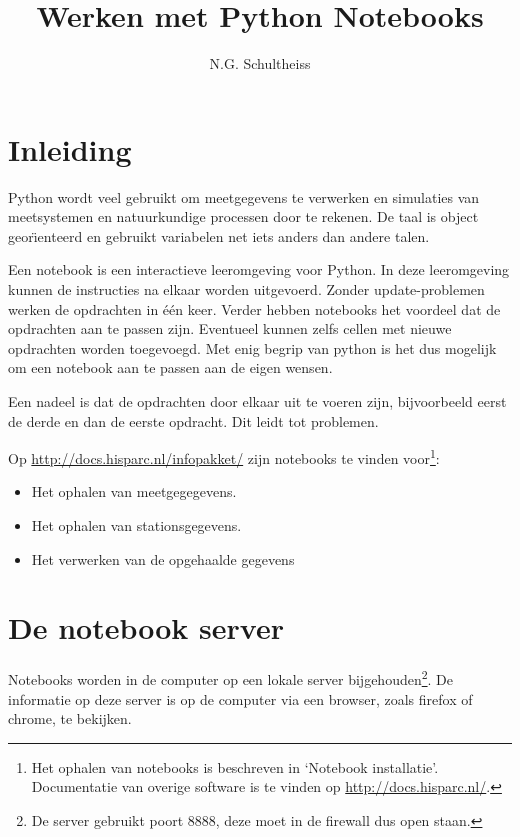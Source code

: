 

\title{Werken met Python Notebooks}
\author{N.G. Schultheiss}



\maketitle

\section{Inleiding}

Python wordt veel gebruikt om meetgegevens te verwerken en simulaties van meetsystemen en natuurkundige 
processen door te rekenen. De taal is object geor\"\i enteerd en gebruikt variabelen net iets anders dan andere 
talen.

Een notebook is een interactieve leeromgeving voor Python. In deze leeromgeving kunnen de instructies na elkaar worden 
uitgevoerd. Zonder update-problemen werken de opdrachten in \'{e}\'{e}n keer. Verder hebben notebooks het voordeel 
dat de opdrachten aan te passen zijn. Eventueel kunnen zelfs cellen met nieuwe opdrachten worden toegevoegd. Met 
enig begrip van python is het dus mogelijk om een notebook aan te passen aan de eigen wensen. 

Een nadeel is dat de opdrachten door elkaar uit te voeren zijn, bijvoorbeeld eerst de derde en dan de eerste opdracht. Dit leidt tot problemen. 

Op \url{http://docs.hisparc.nl/infopakket/} zijn notebooks te vinden voor\footnote{Het ophalen van notebooks is beschreven in `Notebook installatie'. Documentatie van overige \hisparc software is te vinden op \url{http://docs.hisparc.nl/}.}:
\begin{itemize}
\item Het ophalen van meetgegegevens.
\item Het ophalen van stationsgegevens.
\item Het verwerken van de opgehaalde gegevens
\end{itemize}

\section{De notebook server}

Notebooks worden in de computer op een lokale server bijgehouden\footnote{De server gebruikt poort 8888, deze moet in de firewall dus open staan.}. De informatie op deze server is op de computer via een browser, zoals firefox of chrome, te bekijken. 

